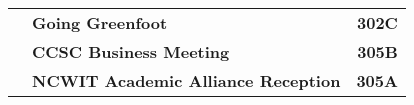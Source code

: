 \noindent
{}
\begin{longtable}[l]{@{}p{1in}@{}p{3in}@{}r}
    {\sffamily\large\textbf{}} & 
    {\sffamily\large\textbf{Going Greenfoot}} & 
    {\sffamily\large\textbf{302C}} \\
    {\sffamily\large\textbf{}} & 
    {\sffamily\large\textbf{CCSC Business Meeting}} & 
    {\sffamily\large\textbf{305B}} \\
%
    {\sffamily\large\textbf{}} & 
    {\sffamily\large\textbf{NCWIT Academic Alliance Reception}} & 
    {\sffamily\large\textbf{305A}} \\

\end{longtable}    

